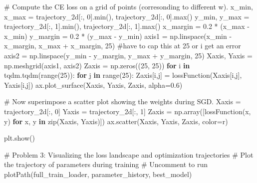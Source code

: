 \documentclass[
  letterpaper,
  DIV=11,
  numbers=noendperiod]{scrartcl}
\newenvironment{Shaded}{\begin{snugshade}}{\end{snugshade}}
\newcommand{\BuiltInTok}[1]{\textcolor[rgb]{0.00,0.23,0.31}{#1}}
\newcommand{\CommentTok}[1]{\textcolor[rgb]{0.37,0.37,0.37}{#1}}
\newcommand{\ControlFlowTok}[1]{\textcolor[rgb]{0.00,0.23,0.31}{\textbf{#1}}}
\newcommand{\DecValTok}[1]{\textcolor[rgb]{0.68,0.00,0.00}{#1}}
\newcommand{\FloatTok}[1]{\textcolor[rgb]{0.68,0.00,0.00}{#1}}
\newcommand{\KeywordTok}[1]{\textcolor[rgb]{0.00,0.23,0.31}{\textbf{#1}}}
\newcommand{\NormalTok}[1]{\textcolor[rgb]{0.00,0.23,0.31}{#1}}
\newcommand{\OperatorTok}[1]{\textcolor[rgb]{0.37,0.37,0.37}{#1}}
\newcommand{\StringTok}[1]{\textcolor[rgb]{0.13,0.47,0.30}{#1}}
\begin{document}
\begin{Shaded}
\begin{Highlighting}[]
    \CommentTok{\# Compute the CE loss on a grid of points (corresonding to different w).}
\NormalTok{    x\_min, x\_max }\OperatorTok{=}\NormalTok{ trajectory\_2d[:, }\DecValTok{0}\NormalTok{].}\BuiltInTok{min}\NormalTok{(), trajectory\_2d[:, }\DecValTok{0}\NormalTok{].}\BuiltInTok{max}\NormalTok{()}
\NormalTok{    y\_min, y\_max }\OperatorTok{=}\NormalTok{ trajectory\_2d[:, }\DecValTok{1}\NormalTok{].}\BuiltInTok{min}\NormalTok{(), trajectory\_2d[:, }\DecValTok{1}\NormalTok{].}\BuiltInTok{max}\NormalTok{()}
\NormalTok{    x\_margin }\OperatorTok{=} \FloatTok{0.2} \OperatorTok{*}\NormalTok{ (x\_max }\OperatorTok{{-}}\NormalTok{ x\_min)}
\NormalTok{    y\_margin }\OperatorTok{=} \FloatTok{0.2} \OperatorTok{*}\NormalTok{ (y\_max }\OperatorTok{{-}}\NormalTok{ y\_min)}
\NormalTok{    axis1 }\OperatorTok{=}\NormalTok{ np.linspace(x\_min }\OperatorTok{{-}}\NormalTok{ x\_margin, x\_max }\OperatorTok{+}\NormalTok{ x\_margin, }\DecValTok{25}\NormalTok{) }\CommentTok{\#have to cap this at 25 or i get an error}
\NormalTok{    axis2 }\OperatorTok{=}\NormalTok{ np.linspace(y\_min }\OperatorTok{{-}}\NormalTok{ y\_margin, y\_max }\OperatorTok{+}\NormalTok{ y\_margin, }\DecValTok{25}\NormalTok{)}
\NormalTok{    Xaxis, Yaxis }\OperatorTok{=}\NormalTok{ np.meshgrid(axis1, axis2)}
\NormalTok{    Zaxis }\OperatorTok{=}\NormalTok{ np.zeros((}\DecValTok{25}\NormalTok{, }\DecValTok{25}\NormalTok{))}
    \ControlFlowTok{for}\NormalTok{ i }\KeywordTok{in}\NormalTok{ tqdm.tqdm(}\BuiltInTok{range}\NormalTok{(}\DecValTok{25}\NormalTok{)):}
        \ControlFlowTok{for}\NormalTok{ j }\KeywordTok{in} \BuiltInTok{range}\NormalTok{(}\DecValTok{25}\NormalTok{):}
\NormalTok{            Zaxis[i,j] }\OperatorTok{=}\NormalTok{ lossFunction(Xaxis[i,j], Yaxis[i,j])}
\NormalTok{    ax.plot\_surface(Xaxis, Yaxis, Zaxis, alpha}\OperatorTok{=}\FloatTok{0.6}\NormalTok{)}

    \CommentTok{\# Now superimpose a scatter plot showing the weights during SGD.}
\NormalTok{    Xaxis }\OperatorTok{=}\NormalTok{ trajectory\_2d[:, }\DecValTok{0}\NormalTok{]}
\NormalTok{    Yaxis }\OperatorTok{=}\NormalTok{ trajectory\_2d[:, }\DecValTok{1}\NormalTok{]}
\NormalTok{    Zaxis }\OperatorTok{=}\NormalTok{ np.array([lossFunction(x, y) }\ControlFlowTok{for}\NormalTok{ x, y }\KeywordTok{in} \BuiltInTok{zip}\NormalTok{(Xaxis, Yaxis)])}
\NormalTok{    ax.scatter(Xaxis, Yaxis, Zaxis, color}\OperatorTok{=}\StringTok{\textquotesingle{}r\textquotesingle{}}\NormalTok{)}

\NormalTok{    plt.show()}

\CommentTok{\# Problem 3: Visualizing the loss landscape and optimization trajectories}
\CommentTok{\# Plot the trajectory of parameters during training}
\CommentTok{\# Uncomment to run}
\NormalTok{plotPath(full\_train\_loader, parameter\_history, best\_model)}
\end{Highlighting}
\end{Shaded}
\end{document}
